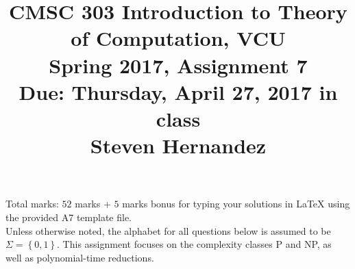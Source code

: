 \documentclass{article}
\newcommand{\set}[1]{{\left\{#1\right\}}}    %
\begin{document}
\title{CMSC 303 Introduction to Theory of Computation, VCU\\Spring 2017, Assignment 7\\Due: Thursday, April 27, 2017 in class\\Steven Hernandez}
\date{}
\maketitle

\vspace{-5mm}
\noindent Total marks: $52$ marks + $5$ marks bonus for typing your solutions in LaTeX using the provided A7 template file.\vspace{2mm}\\

\noindent Unless otherwise noted, the alphabet for all questions below is assumed to be $\Sigma=\set{0,1}$. This assignment focuses on the complexity classes P and NP, as well as polynomial-time reductions.
\end{document}
